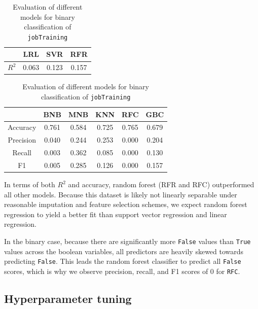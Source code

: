 \documentclass{article} %
\begin{document}
\begin{table}[H]
  \begin{minipage}{0.30\textwidth}
    \centering
    \begin{tabular}{| c | c | c | c |}
      \hline
      ~ & LRL & SVR & RFR \\ \hline
      $R^2$ & 0.063 & 0.123 & 0.157 \\
      \hline
    \end{tabular}
    \caption{Evaluation of different models for continuous regression of \texttt{gpa}}
    \label{tab:contresults}
  \end{minipage}%
  \hfill
  \begin{minipage}{0.60\textwidth}
    \centering
    \begin{tabular}{| c | c | c | c | c | c |}
      \hline
      ~ & BNB & MNB & KNN & RFC & GBC \\ \hline
      Accuracy & 0.761 & 0.584 & 0.725 & 0.765 & 0.679 \\
      Precision & 0.040 & 0.244 & 0.253 & 0.000 & 0.204 \\
      Recall & 0.003 & 0.362 & 0.085 & 0.000 & 0.130 \\
      F1 & 0.005 & 0.285 & 0.126 & 0.000 & 0.157 \\
      \hline
    \end{tabular}
    \caption{Evaluation of different models for binary classification of \texttt{jobTraining}}
    \label{tab:boolresults}
  \end{minipage}
\end{table}

In terms of both $R^2$ and accuracy, random forest (RFR and RFC) outperformed all other models. Because this dataset is likely not linearly separable under reasonable imputation and feature selection schemes, we expect random forest regression to yield a better fit than support vector regression and linear regression.

In the binary case, because there are significantly more \texttt{False} values than \texttt{True} values across the boolean variables, all predictors are heavily skewed towards predicting \texttt{False}. This leads the random forest classifier to predict all \texttt{False} scores, which is why we observe precision, recall, and F1 scores of 0 for \texttt{RFC}.

\subsection{Hyperparameter tuning}
\label{sec:hyperparametertuning}
\end{document}
